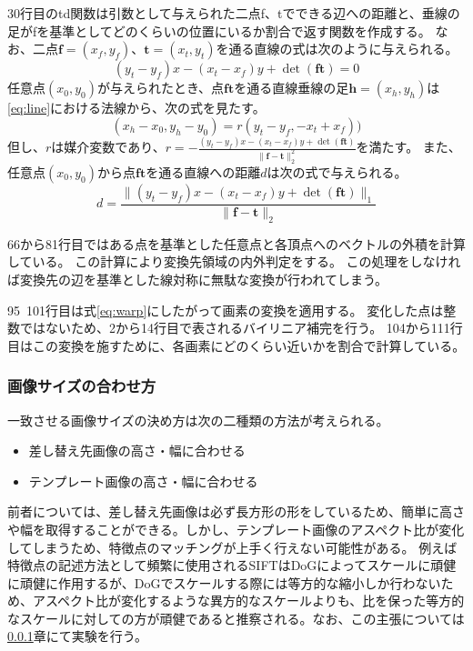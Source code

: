 30行目のtd関数は引数として与えられた二点f、tでできる辺への距離と、垂線の足がfを基準としてどのくらいの位置にいるか割合で返す関数を作成する。
なお、二点$\bm{f}=(x_f, y_f)$、$\bm{t}=(x_t, y_t)$を通る直線の式は次のように与えられる。
\begin{equation} \label{eq:line}
(y_t - y_f) x - (x_t - x_f) y + \det{(\bm{f}\bm{t})} = 0
\end{equation}
任意点$(x_0, y_0)$が与えられたとき、点$\bm{ft}$を通る直線垂線の足$\bm{h}=(x_h, y_h)$は\ref{eq:line}における法線から、次の式を見たす。
\begin{equation}
(x_h - x_0, y_h - y_0) = r (y_t - y_f, -x_t + x_f))
\end{equation}
但し、$r$は媒介変数であり、$r=-\frac{(y_t - y_f) x - (x_t - x_f) y + \det{(\bm{f}\bm{t})}}{\|\bm{f}-\bm{t}\|_2^2}$を満たす。
また、任意点$(x_0, y_0)$から点$\bm{ft}$を通る直線への距離$d$は次の式で与えられる。
\begin{equation}
d = \frac{\|(y_t - y_f) x - (x_t - x_f) y + \det{(\bm{f}\bm{t})\|_1}}{\|\bm{f}-\bm{t}\|_2}
\end{equation}

66から81行目ではある点を基準とした任意点と各頂点へのベクトルの外積を計算している。
この計算により変換先領域の内外判定をする。
この処理をしなければ変換先の辺を基準とした線対称に無駄な変換が行われてしまう。

95~101行目は式\ref{eq:warp}にしたがって画素の変換を適用する。
変化した点は整数ではないため、2から14行目で表されるバイリニア補完を行う。
104から111行目はこの変換を施すために、各画素にどのくらい近いかを割合で計算している。

\subsubsection{画像サイズの合わせ方}
一致させる画像サイズの決め方は次の二種類の方法が考えられる。
\begin{itemize}
    \item 差し替え先画像の高さ・幅に合わせる
    \item テンプレート画像の高さ・幅に合わせる
\end{itemize}

前者については、差し替え先画像は必ず長方形の形をしているため、簡単に高さや幅を取得することができる。しかし、テンプレート画像のアスペクト比が変化してしまうため、特徴点のマッチングが上手く行えない可能性がある。
例えば特徴点の記述方法として頻繁に使用されるSIFT\cite{}はDoG\cite{}によってスケールに頑健に頑健に作用するが、DoGでスケールする際には等方的な縮小しか行わないため、アスペクト比が変化するような異方的なスケールよりも、比を保った等方的なスケールに対しての方が頑健であると推察される。なお、この主張については\ref{}章にて実験を行う。

